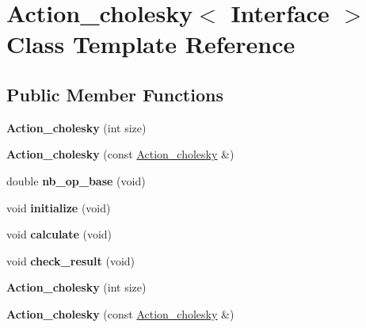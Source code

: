 \hypertarget{class_action__cholesky}{}\section{Action\+\_\+cholesky$<$ Interface $>$ Class Template Reference}
\label{class_action__cholesky}
\subsection*{Public Member Functions}
\begin{DoxyCompactItemize}
\item 
\mbox{\label{class_action__cholesky_a10f4dc80fcd0539c57f076128cafc337}} 
{\bfseries Action\+\_\+cholesky} (int size)
\item 
\mbox{\label{class_action__cholesky_a843eaf4db8d1a1c42912437f4873ceec}} 
{\bfseries Action\+\_\+cholesky} (const \hyperlink{class_action__cholesky}{Action\+\_\+cholesky} \&)
\item 
\mbox{\label{class_action__cholesky_adb4d5872b54ef3704dc018ab02cd494d}} 
double {\bfseries nb\+\_\+op\+\_\+base} (void)
\item 
\mbox{\label{class_action__cholesky_aba488d820317e2a8ad65bad477d0525b}} 
void {\bfseries initialize} (void)
\item 
\mbox{\label{class_action__cholesky_aa16837f8c6f05f93b26625e606011899}} 
void {\bfseries calculate} (void)
\item 
\mbox{\label{class_action__cholesky_ae55c8b5159bb9458987b0ab9f50edc38}} 
void {\bfseries check\+\_\+result} (void)
\item 
\mbox{\label{class_action__cholesky_a10f4dc80fcd0539c57f076128cafc337}} 
{\bfseries Action\+\_\+cholesky} (int size)
\item 
\mbox{\label{class_action__cholesky_a843eaf4db8d1a1c42912437f4873ceec}} 
{\bfseries Action\+\_\+cholesky} (const \hyperlink{class_action__cholesky}{Action\+\_\+cholesky} \&)

\end{DoxyCompactItemize}
